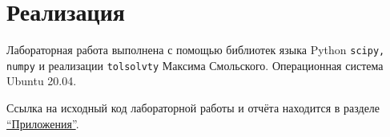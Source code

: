 \section{Реализация}

Лабораторная работа выполнена с помощью библиотек языка Python \texttt{scipy, numpy} и реализации \texttt{tolsolvty} Максима Смольского. Операционная система Ubuntu 20.04.

Ссылка на исходный код лабораторной работы и отчёта находится в разделе \hyperref[app]{``Приложения''}.